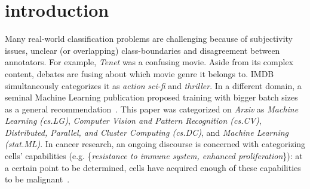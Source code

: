 
\section{introduction}
\label{sec:org662677c}





Many real-world classification problems are challenging because of
subjectivity issues, unclear (or overlapping) class-boundaries and
disagreement between annotators. For example, \textit{Tenet} was a confusing
movie. Aside from its complex content, debates are fusing about which movie
genre it belongs to. IMDB simultaneously categorizes it as \textit{action}
\textit{sci-fi} and \textit{thriller}. In a different domain, a seminal
Machine Learning publication proposed training with bigger batch sizes as a
general recommendation~\cite{bigBS}. This paper was categorized on
\textit{Arxiv}  as \textit{Machine Learning (cs.LG)},
\textit{Computer Vision and Pattern Recognition (cs.CV)}, \textit{Distributed,
Parallel, and Cluster Computing (cs.DC)}, and \textit{Machine Learning
(stat.ML)}. In cancer research, an ongoing discourse is concerned with
categorizing cells' capabilities (e.g. \{\textit{resistance to immune system,
enhanced proliferation}\}): at a certain point to be determined, cells have
acquired enough of these capabilities to be malignant~\cite{cancerHallmarks}.

